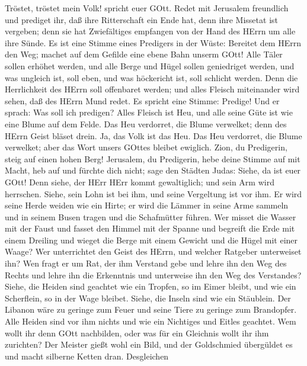  Tröstet, tröstet mein Volk! spricht euer GOtt. 
Redet mit Jerusalem freundlich und prediget ihr, daß ihre Ritterschaft
ein Ende hat, denn ihre Missetat ist vergeben; denn sie hat Zwiefältiges
empfangen von der Hand des HErrn um alle ihre Sünde.  Es ist
eine Stimme eines Predigers in der Wüste: Bereitet dem HErrn den Weg;
machet auf dem Gefilde eine ebene Bahn unserm GOtt!  Alle
Täler sollen erhöhet werden, und alle Berge und Hügel sollen geniedriget
werden, und was ungleich ist, soll eben, und was höckericht ist, soll
schlicht werden.  Denn die Herrlichkeit des HErrn soll
offenbaret werden; und alles Fleisch miteinander wird sehen, daß des
HErrn Mund redet.  Es spricht eine Stimme: Predige! Und er
sprach: Was soll ich predigen? Alles Fleisch ist Heu, und alle seine
Güte ist wie eine Blume auf dem Felde.  Das Heu verdorret,
die Blume verwelket; denn des HErrn Geist bläset drein. Ja, das Volk ist
das Heu.  Das Heu verdorret, die Blume verwelket; aber das
Wort unsers GOttes bleibet ewiglich.  Zion, du Predigerin,
steig auf einen hohen Berg! Jerusalem, du Predigerin, hebe deine Stimme
auf mit Macht, heb auf und fürchte dich nicht; sage den Städten Judas:
Siehe, da ist euer GOtt!  Denn siehe, der HErr HErr kommt
gewaltiglich; und sein Arm wird herrschen. Siehe, sein Lohn ist bei ihm,
und seine Vergeltung ist vor ihm.  Er wird seine Herde
weiden wie ein Hirte; er wird die Lämmer in seine Arme sammeln und in
seinem Busen tragen und die Schafmütter führen.  Wer misset
die Wasser mit der Faust und fasset den Himmel mit der Spanne und
begreift die Erde mit einem Dreiling und wieget die Berge mit einem
Gewicht und die Hügel mit einer Waage?  Wer unterrichtet
den Geist des HErrn, und welcher Ratgeber unterweiset ihn? 
Wen fragt er um Rat, der ihm Verstand gebe und lehre ihn den Weg des
Rechts und lehre ihn die Erkenntnis und unterweise ihn den Weg des
Verstandes?  Siehe, die Heiden sind geachtet wie ein
Tropfen, so im Eimer bleibt, und wie ein Scherflein, so in der Wage
bleibet. Siehe, die Inseln sind wie ein Stäublein.  Der
Libanon wäre zu geringe zum Feuer und seine Tiere zu geringe zum
Brandopfer.  Alle Heiden sind vor ihm nichts und wie ein
Nichtiges und Eitles geachtet.  Wem wollt ihr denn GOtt
nachbilden, oder was für ein Gleichnis wollt ihr ihm zurichten?
 Der Meister gießt wohl ein Bild, und der Goldschmied
übergüldet es und macht silberne Ketten dran.  Desgleichen
